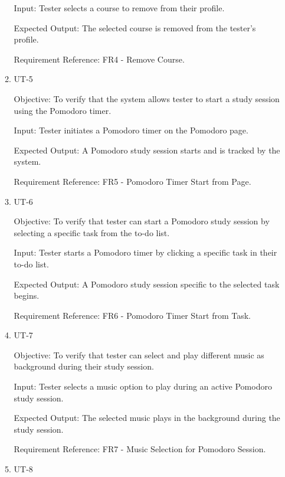 \documentclass[12pt, titlepage]{article}
\begin{document}
\begin{enumerate}
\begin{enumerate}
        Input: Tester selects a course to remove from their profile.
        
        Expected Output: The selected course is removed from the tester's profile.
        
        Requirement Reference: FR4 - Remove Course.
        
    \item{UT-5\\}\label{UT-5}
    
        Objective: To verify that the system allows tester to start a study session using the Pomodoro timer.
        
        Input: Tester initiates a Pomodoro timer on the Pomodoro page.
        
        Expected Output: A Pomodoro study session starts and is tracked by the system.
        
        Requirement Reference: FR5 - Pomodoro Timer Start from Page.
        
    \item{UT-6\\}\label{UT-6}
    
        Objective: To verify that tester can start a Pomodoro study session by selecting a specific task from the to-do list.
        
        Input: Tester starts a Pomodoro timer by clicking a specific task in their to-do list.
        
        Expected Output: A Pomodoro study session specific to the selected task begins.
        
        Requirement Reference: FR6 - Pomodoro Timer Start from Task.
        
    \item{UT-7\\}\label{UT-7}
    
        Objective: To verify that tester can select and play different music as background during their study session.
        
        Input: Tester selects a music option to play during an active Pomodoro study session.
        
        Expected Output: The selected music plays in the background during the study session.
        
        Requirement Reference: FR7 - Music Selection for Pomodoro Session.
        
    \item{UT-8\\}\label{UT-8}
    

\end{enumerate}
\end{enumerate}
\end{document}
